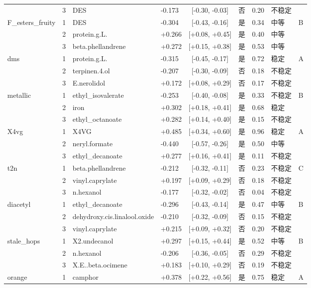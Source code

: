 \begin{longtable}{llllcccll}
 & 3 & DES & -0.173 & [-0.30, -0.03] & 否 & 0.20 & 不稳定 &  \\
F\_esters\_fruity & 1 & DES & -0.304 & [-0.43, -0.16] & 是 & 0.34 & 中等 & B \\
 & 2 & protein.g.L. & +0.266 & [+0.08, +0.45] & 是 & 0.40 & 中等 &  \\
 & 3 & beta.phellandrene & +0.272 & [+0.15, +0.38] & 是 & 0.53 & 中等 &  \\
dms & 1 & protein.g.L. & -0.315 & [-0.45, -0.17] & 是 & 0.72 & 稳定 & A \\
 & 2 & terpinen.4.ol & -0.207 & [-0.30, -0.09] & 否 & 0.18 & 不稳定 &  \\
 & 3 & E.nerolidol & +0.172 & [+0.08, +0.29] & 否 & 0.17 & 不稳定 &  \\
metallic & 1 & ethyl\_isovalerate & -0.253 & [-0.40, -0.08] & 是 & 0.33 & 不稳定 & B \\
 & 2 & iron & +0.302 & [+0.18, +0.41] & 是 & 0.68 & 稳定 &  \\
 & 3 & ethyl\_octanoate & +0.282 & [+0.14, +0.40] & 是 & 0.15 & 不稳定 &  \\
X4vg & 1 & X4VG & +0.485 & [+0.34, +0.60] & 是 & 0.96 & 稳定 & A \\
 & 2 & neryl.formate & -0.440 & [-0.57, -0.26] & 是 & 0.50 & 中等 &  \\
 & 3 & ethyl\_decanoate & +0.277 & [+0.16, +0.41] & 是 & 0.11 & 不稳定 &  \\
t2n & 1 & beta.phellandrene & -0.212 & [-0.32, -0.11] & 否 & 0.23 & 不稳定 & C \\
 & 2 & vinyl.caprylate & +0.197 & [+0.09, +0.29] & 否 & 0.18 & 不稳定 &  \\
 & 3 & n.hexanol & -0.177 & [-0.32, -0.02] & 否 & 0.04 & 不稳定 &  \\
diacetyl & 1 & ethyl\_decanoate & -0.296 & [-0.43, -0.14] & 是 & 0.47 & 中等 & B \\
 & 2 & dehydroxy.cis.linalool.oxide & -0.210 & [-0.32, -0.09] & 否 & 0.15 & 不稳定 &  \\
 & 3 & vinyl.caprylate & +0.215 & [+0.09, +0.32] & 否 & 0.20 & 不稳定 &  \\
stale\_hops & 1 & X2.undecanol & +0.297 & [+0.15, +0.44] & 是 & 0.52 & 中等 & B \\
 & 2 & n.hexanol & -0.206 & [-0.36, -0.05] & 否 & 0.29 & 不稳定 &  \\
 & 3 & X.E..beta.ocimene & +0.183 & [+0.10, +0.29] & 否 & 0.19 & 不稳定 &  \\
orange & 1 & camphor & +0.378 & [+0.22, +0.56] & 是 & 0.75 & 稳定 & A \\

\end{longtable}
